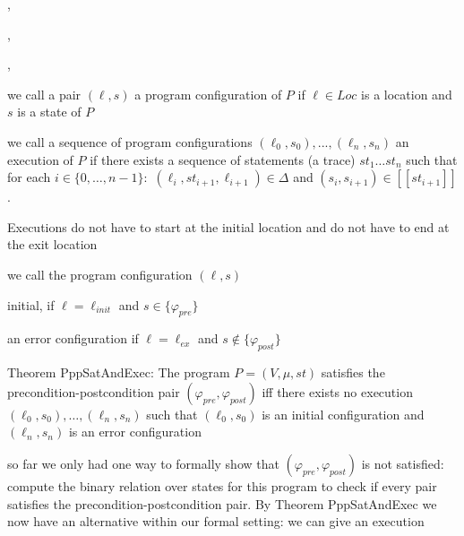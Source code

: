 \documentclass[landscape, a4paper]{article}
\begin{document}
\begin{minipage}[t]{0.2\linewidth}
\begin{betterlist}
\begin{betterlist}
		\end{betterlist}
		\item {}, 
		\item {}, 
		\item {}, 
		\item {}
		\item \color{orange}we call a pair $(\ell, s)$ a \alert{program configuration} of $P$ if $\ell \in Loc$ is a location and $s$ is a state of $P$\color{black}
		\item \color{orange}we call a sequence of program configurations $(\ell_0, s_0), . . . , (\ell_n, s_n)$ an \alert{execution} of $P$ if there exists a sequence of statements (a trace) $st_1 \ldots st_n$ such that for each $i \in \{0, \ldots, n−1\}:$ $(\ell_i, st_{i+1}, \ell_{i+1}) \in \Delta$ and $(s_i, s_{i+1}) \in [[st_{i+1}]]$. \color{black}
		\begin{betterlist}
			\item Executions do not have to start at the initial location and do not have to end at the exit location
		\end{betterlist}
		\item \color{orange}we call the program configuration $(\ell, s)$
		\begin{betterlist}
			\item \alert{initial}, if $\ell= \ell_{init}$ and $s \in\{\varphi_{pre}\}$
			\item an \alert{error configuration} if $\ell= \ell_{ex}$ and $s \not\in \{\varphi_{post}\}$
		\end{betterlist}\color{black}
		\item \color{orange}\alert{Theorem PppSatAndExec:} The program $P = (V, \mu, st)$ satisfies the precondition-postcondition pair $(\varphi_{pre}, \varphi_{post})$ iff there exists no execution $(\ell_0, s_0), \ldots, (\ell_n, s_n)$ such that $(\ell_0, s_0)$ is an initial configuration and $(\ell_n, s_n)$ is an error configuration\color{black}
		\begin{betterlist}
			\item so far we only had one way to formally show that $(\varphi_{pre}, \varphi_{post})$ is not satisfied: compute the binary relation over states for this program to check if every pair satisfies the precondition-postcondition pair. By Theorem PppSatAndExec we now have an alternative within our formal setting: we can give an execution

\end{betterlist}
\end{betterlist}
\end{minipage}
\end{document}
